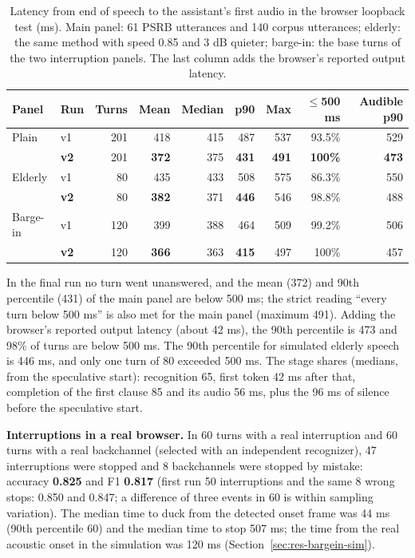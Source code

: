 \begin{table}[ht]
\centering
\caption{Latency from end of speech to the assistant's first audio in the browser loopback test
         (ms). Main panel: 61 PSRB utterances and 140 corpus utterances; elderly: the same
         method with speed 0.85 and 3 dB quieter; barge-in: the base turns of the two
         interruption panels. The last column adds the browser's reported output latency.}
\label{tab:latency}
\small
\begin{tabular}{llrrrrrrr}
\toprule
Panel & Run & Turns & Mean & Median & p90 & Max & $\le$500 ms & Audible p90 \\
\midrule
Plain & v1 & 201 & 418 & 415 & 487 & 537 & 93.5\% & 529 \\
 & \textbf{v2} & 201 & \textbf{372} & 375 & \textbf{431} & \textbf{491} & \textbf{100\%} & \textbf{473} \\
Elderly & v1 & 80 & 435 & 433 & 508 & 575 & 86.3\% & 550 \\
 & \textbf{v2} & 80 & \textbf{382} & 371 & \textbf{446} & 546 & 98.8\% & 488 \\
Barge-in & v1 & 120 & 399 & 388 & 464 & 509 & 99.2\% & 506 \\
 & \textbf{v2} & 120 & \textbf{366} & 363 & \textbf{415} & 497 & 100\% & 457 \\
\bottomrule
\end{tabular}
\end{table}

In the final run no turn went unanswered, and the mean (372) and 90th percentile (431) of the
main panel are below 500 ms; the strict reading ``every turn below 500 ms'' is also met for the
main panel (maximum 491). Adding the browser's reported output latency (about 42 ms), the 90th
percentile is 473 and 98\% of turns are below 500 ms. The 90th percentile for simulated elderly
speech is 446 ms, and only one turn of 80 exceeded 500 ms. The stage shares (medians, from the
speculative start): recognition 65, first token 42 ms after that, completion of the first clause
85 and its audio 56 ms, plus the 96 ms of silence before the speculative start.

\textbf{Interruptions in a real browser.} In 60 turns with a real interruption and 60 turns with
a real backchannel (selected with an independent recognizer), 47 interruptions were stopped and
8 backchannels were stopped by mistake: accuracy \textbf{0.825} and F1 \textbf{0.817} (first
run 50 interruptions and the same 8 wrong stops: 0.850 and 0.847; a difference of three events
in 60 is within sampling variation). The median time to duck from the detected onset frame was
44 ms (90th percentile 60) and the median time to stop 507 ms; the time from the real acoustic
onset in the simulation was 120 ms (Section~\ref{sec:res-bargein-sim}).

